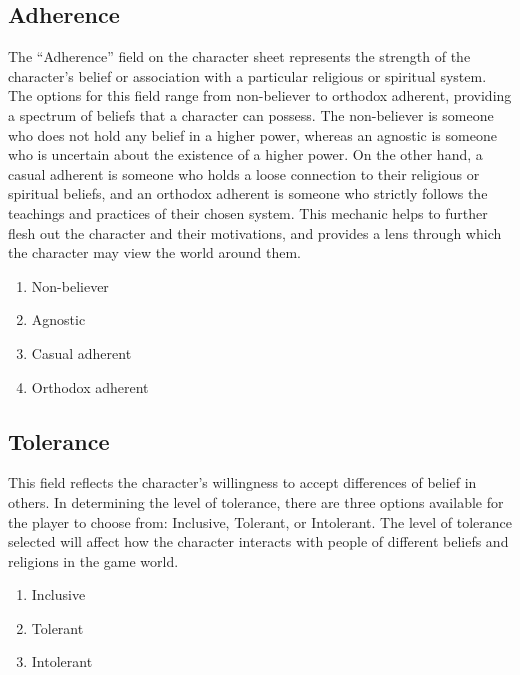 \hypertarget{adherence}{%
\subsection{Adherence}\label{adherence}}

The ``Adherence'' field on the character sheet represents the strength
of the character's belief or association with a particular religious or
spiritual system. The options for this field range from non-believer to
orthodox adherent, providing a spectrum of beliefs that a character can
possess. The non-believer is someone who does not hold any belief in a
higher power, whereas an agnostic is someone who is uncertain about the
existence of a higher power. On the other hand, a casual adherent is
someone who holds a loose connection to their religious or spiritual
beliefs, and an orthodox adherent is someone who strictly follows the
teachings and practices of their chosen system. This mechanic helps to
further flesh out the character and their motivations, and provides a
lens through which the character may view the world around them.

\begin{enumerate}
\def\labelenumi{\arabic{enumi}.}
\tightlist
\item
  Non-believer
\item
  Agnostic
\item
  Casual adherent
\item
  Orthodox adherent
\end{enumerate}

\hypertarget{tolerance}{%
\subsection{Tolerance}\label{tolerance}}

This field reflects the character's willingness to accept differences of
belief in others. In determining the level of tolerance, there are three
options available for the player to choose from: Inclusive, Tolerant, or
Intolerant. The level of tolerance selected will affect how the
character interacts with people of different beliefs and religions in
the game world.

\begin{enumerate}
\def\labelenumi{\arabic{enumi}.}
\tightlist
\item
  Inclusive
\item
  Tolerant
\item
  Intolerant
\end{enumerate}

